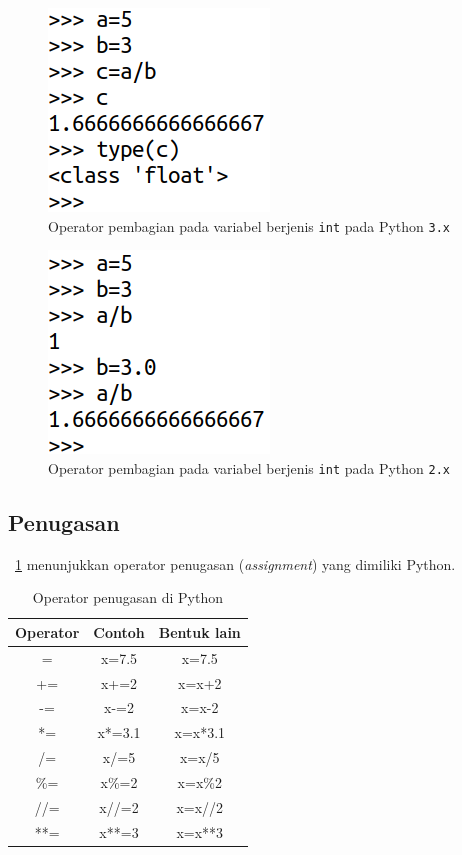 \begin{figure}
  \begin{center}
    \includegraphics[scale=2.0]{pics/pembagian.png}
    \caption{Operator pembagian pada variabel berjenis \texttt{int} pada Python \texttt{3.x}}
    \label{fig:pembagian}
  \end{center}
\end{figure}


\begin{figure}
  \begin{center}
    \includegraphics[scale=2.0]{pics/pembagian2.png}
    \caption{Operator pembagian pada variabel berjenis \texttt{int} pada Python \texttt{2.x}}
    \label{fig:pembagian2}
  \end{center}
\end{figure}

\subsection{Penugasan}
\tablename~\ref{tab:assignment} menunjukkan operator penugasan (\textit{assignment}) yang dimiliki Python.

\begin{table}[h]
\caption{Operator penugasan di Python}
\label{tab:assignment}
  \begin{center}
    \begin{tabular}{@{}ccc@{}}\toprule
    Operator & Contoh & Bentuk lain\\ \midrule
    = & x=7.5 & x=7.5\\
    += & x+=2 & x=x+2 \\
    -= & x-=2 & x=x-2\\
    *= & x*=3.1 & x=x*3.1\\
    /= & x/=5 & x=x/5\\
    \%= & x\%=2 & x=x\%2\\
    //= & x//=2 & x=x//2\\
    **= & x**=3 & x=x**3\\
       \bottomrule
    \end{tabular}
  \end{center}
\end{table}

